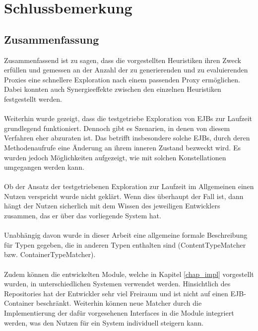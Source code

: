 \chapter{Schlussbemerkung}\label{chap_finish}
\section{Zusammenfassung}
Zusammenfassend ist zu sagen, dass die vorgestellten Heuristiken ihren Zweck erfüllen und gemessen an der Anzahl der zu generierenden und zu evaluierenden Proxies eine schnellere Exploration nach einem passenden Proxy ermöglichen. Dabei konnten auch Synergieeffekte zwischen den einzelnen Heuristiken festgestellt werden.
\\\\
Weiterhin wurde gezeigt, dass die testgetriebe Exploration von EJBs zur Laufzeit grundlegend funktioniert. Dennoch gibt es Szenarien, in denen von diesem Verfahren eher abzuraten ist. Das betrifft insbesondere solche EJBs, durch deren Methodenaufrufe eine Änderung an ihrem inneren Zustand bezweckt wird. Es wurden jedoch Möglichkeiten aufgezeigt, wie mit solchen Konstellationen umgegangen werden kann.
\\\\
Ob der Ansatz der testgetriebenen Exploration zur Laufzeit im Allgemeinen einen Nutzen verspricht wurde nicht geklärt. Wenn dies überhaupt der Fall ist, dann hängt der Nutzen sicherlich mit dem Wissen des jeweiligen Entwicklers zusammen, das er über das vorliegende System hat.
\\\\
Unabhängig davon wurde in dieser Arbeit eine allgemeine formale Beschreibung für Typen gegeben, die in anderen Typen enthalten sind (ContentTypeMatcher bzw. ContainerTypeMatcher). 
\\\\
Zudem können die entwickelten Module, welche in Kapitel \ref{chap_impl} vorgestellt wurden, in unterschiedlichen Systemen verwendet werden. Hinsichtlich des Repositories hat der Entwickler sehr viel Freiraum und ist nicht auf einen EJB-Container beschränkt. Weiterhin können neue Matcher durch die Implementierung der dafür vorgesehenen Interfaces in die Module integriert werden, was den Nutzen für ein System individuell steigern kann.
